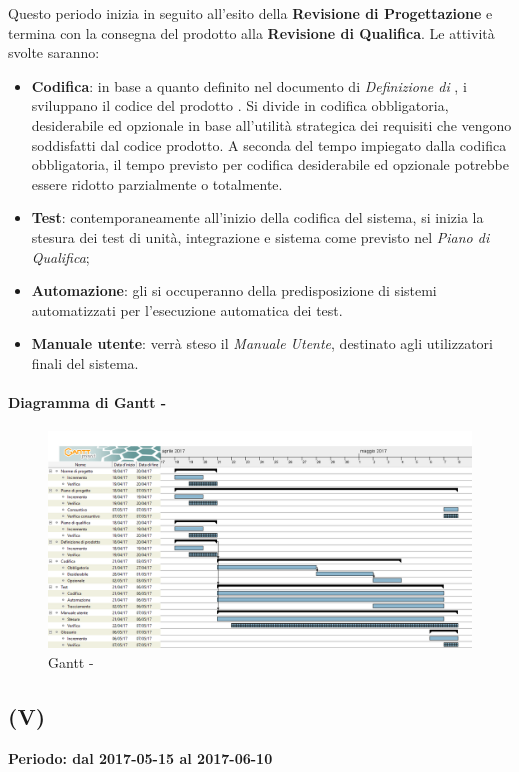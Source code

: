 \documentclass[./PianoDiProgetto.tex]{subfiles}
\begin{document}
  Questo periodo inizia in seguito all'esito della \textbf{Revisione di Progettazione} e termina con la consegna del prodotto alla \textbf{Revisione di Qualifica}. Le attività svolte saranno:
  \begin{itemize}
    \item \textbf{Codifica}: in base a quanto definito nel documento di \textit{Definizione di }, i \PRP{} sviluppano il codice del prodotto . Si divide in codifica obbligatoria, desiderabile ed opzionale in base all'utilità strategica dei requisiti che vengono soddisfatti dal codice prodotto. A seconda del tempo impiegato dalla codifica obbligatoria, il tempo previsto per codifica desiderabile ed opzionale potrebbe essere ridotto parzialmente o totalmente.
    \item \textbf{Test}: contemporaneamente all'inizio della codifica del sistema, si inizia la stesura dei test di unità, integrazione e sistema come previsto nel \textit{Piano di Qualifica};
    \item \textbf{Automazione}: gli \AMMP{} si occuperanno della predisposizione di sistemi automatizzati per l'esecuzione automatica dei test.
    \item \textbf{Manuale utente}: verrà steso il \textit{Manuale Utente}, destinato agli utilizzatori finali del sistema.
  \end{itemize}

  \newpage
  \paragraph{Diagramma di Gantt - \PerC}
    \begin{figure}[!h]
    \centering
    \includegraphics[width=\textwidth]{images/C}
    \caption{Gantt - \PerC}
    \end{figure}

  \subsection{\PerV (V)}
  \textbf{Periodo: dal 2017-05-15 al 2017-06-10}
\end{document}
